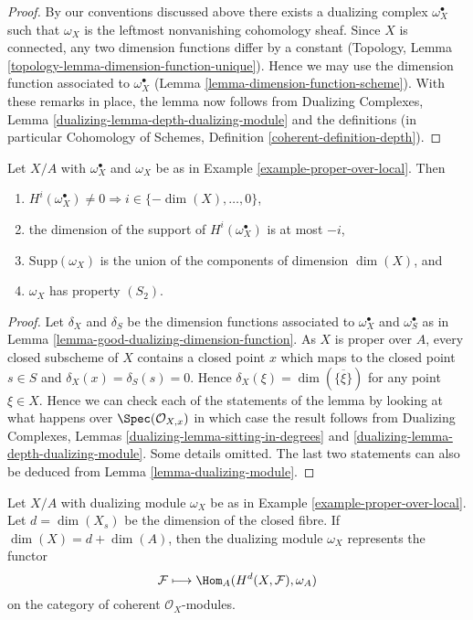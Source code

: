 \begin{proof}
By our conventions discussed above there exists a dualizing complex
$\omega_X^\bullet$ such that $\omega_X$ is the leftmost nonvanishing
cohomology sheaf. Since $X$ is connected, any two dimension functions
differ by a constant
(Topology, Lemma \ref{topology-lemma-dimension-function-unique}).
Hence we may use the
dimension function associated to $\omega_X^\bullet$
(Lemma \ref{lemma-dimension-function-scheme}).
With these remarks in place, the lemma now
follows from Dualizing Complexes, Lemma
\ref{dualizing-lemma-depth-dualizing-module}
and the definitions (in particular
Cohomology of Schemes, Definition \ref{coherent-definition-depth}).
\end{proof}

\begin{lemma}
\label{lemma-vanishing-good-dualizing}
Let $X/A$ with $\omega_X^\bullet$ and $\omega_X$ be as in
Example \ref{example-proper-over-local}. Then
\begin{enumerate}
\item $H^i(\omega_X^\bullet) \not = 0 \Rightarrow
i \in \{-\dim(X), \ldots, 0\}$,
\item the dimension of the support of $H^i(\omega_X^\bullet)$ is at most $-i$,
\item $\text{Supp}(\omega_X)$ is the union of
the components of dimension $\dim(X)$, and
\item $\omega_X$ has property $(S_2)$.
\end{enumerate}
\end{lemma}

\begin{proof}
Let $\delta_X$ and $\delta_S$ be the dimension functions associated to
$\omega_X^\bullet$ and $\omega_S^\bullet$ as in
Lemma \ref{lemma-good-dualizing-dimension-function}.
As $X$ is proper over $A$, every closed subscheme of $X$ contains
a closed point $x$ which maps to the closed point $s \in S$
and $\delta_X(x) = \delta_S(s) = 0$. Hence
$\delta_X(\xi) = \dim(\overline{\{\xi\}})$ for any point
$\xi \in X$. Hence we can check each of
the statements of the lemma by looking at what happens over
$\Spec(\mathcal{O}_{X, x})$ in which case the result follows
from Dualizing Complexes, Lemmas \ref{dualizing-lemma-sitting-in-degrees} and
\ref{dualizing-lemma-depth-dualizing-module}.
Some details omitted.
The last two statements can also be deduced from
Lemma \ref{lemma-dualizing-module}.
\end{proof}

\begin{lemma}
\label{lemma-dualizing-module-proper-over-A}
Let $X/A$ with dualizing module $\omega_X$ be as in
Example \ref{example-proper-over-local}.
Let $d = \dim(X_s)$ be the dimension
of the closed fibre. If $\dim(X) = d + \dim(A)$, then
the dualizing module $\omega_X$ represents the functor
$$
\mathcal{F} \longmapsto \Hom_A(H^d(X, \mathcal{F}), \omega_A)
$$
on the category of coherent $\mathcal{O}_X$-modules.
\end{lemma}


